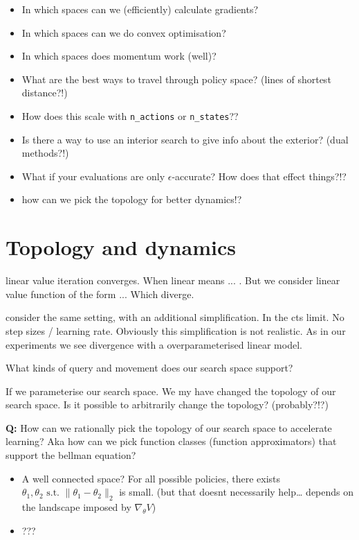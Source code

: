 \begin{itemize}
\tightlist
\item In which spaces can we (efficiently) calculate gradients?
\item In which spaces can we do convex optimisation?
\item In which spaces does momentum work (well)?
\end{itemize}


\begin{itemize}
\tightlist
\item
  What are the best ways to travel through policy space? (lines of
  shortest distance?!)
\item
  How does this scale with \texttt{n\_actions} or \texttt{n\_states}??
\item
  Is there a way to use an interior search to give info about the
  exterior? (dual methods?!)
\item
  What if your evaluations are only \(\epsilon\)-accurate? How does that
  effect things?!?
\item
  how can we pick the topology for better dynamics!?
\end{itemize}

\section{Topology and dynamics}

\cite{Tsitsiklis2000} linear value iteration converges. When linear means ... . But we consider linear value function of the form ...
Which diverge.

\cite{Brandfonbrener2019} consider the same setting, with an additional simplification. In the cts limit. No step sizes / learning rate.
Obviously this simplification is not realistic. As in our experiments we see divergence with a overparameterised linear model.

What kinds of query and movement does our search space support?

If we parameterise our search space. We my have changed the topology of our search space.
Is it possible to arbitrarily change the topology? (probably?!?)

\textbf{Q:} How can we rationally pick the topology of our search space
to accelerate learning?
Aka how can we pick function classes (function approximators) that support the bellman equation?

\begin{itemize}
\item
  A well connected space? For all possible policies, there exists
  \(\theta_1, \theta_2 \text{ s.t. } \parallel \theta_1- \theta_2\parallel_2\)
  is small. (but that doesnt necessarily help\ldots{} depends on the
  landscape imposed by \(\nabla_{\theta} V\))
\item
  ???
\end{itemize}

